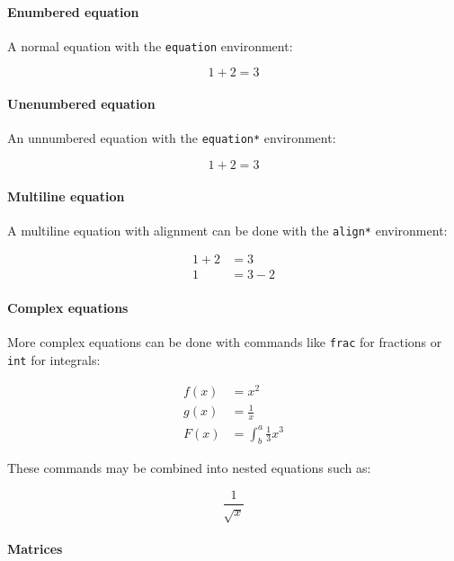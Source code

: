 \documentclass{article}
\begin{document}
\paragraph{Enumbered equation}

A normal equation with the \texttt{equation} environment:

\begin{equation}
    1 + 2 = 3
\end{equation}

\paragraph{Unenumbered equation}

An unnumbered equation with the \texttt{equation*} environment:

\begin{equation*}
    1 + 2 = 3
\end{equation*}

\paragraph{Multiline equation}

A multiline equation with alignment can be done with the \texttt{align*}
environment:

\begin{align*}
    1 + 2 &= 3 \\
    1 &= 3 - 2
\end{align*}

\paragraph{Complex equations}

More complex equations can be done with commands like \texttt{frac} for
fractions or \texttt{int} for integrals:

\begin{align*}
    f(x) &= x^2 \\
    g(x) &= \frac{1}{x} \\
    F(x) &= \int^a_b \frac{1}{3}x^3
\end{align*}

These commands may be combined into nested equations such as:

\begin{equation*}
    \frac{1}{\sqrt{x}}
\end{equation*}

\paragraph{Matrices}
\end{document}
